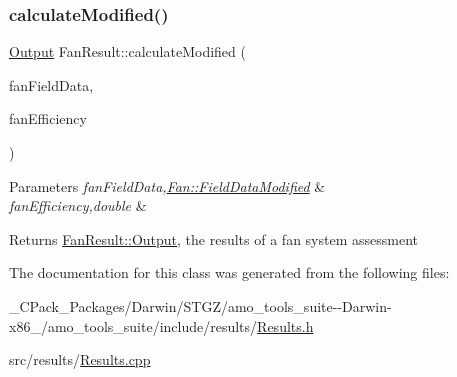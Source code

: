 \subsubsection{\texorpdfstring{calculate\+Modified()}{calculateModified()}\hspace{0.1cm}{\footnotesize\ttfamily [3/3]}}
{\footnotesize\ttfamily \hyperlink{struct_fan_result_1_1_output}{Output} Fan\+Result\+::calculate\+Modified (\begin{DoxyParamCaption}\item[{\hyperlink{struct_fan_1_1_field_data_modified}{Fan\+::\+Field\+Data\+Modified} const \&}]{fan\+Field\+Data,  }\item[{double}]{fan\+Efficiency }\end{DoxyParamCaption})}


\begin{DoxyParams}{Parameters}
{\em fan\+Field\+Data,\hyperlink{struct_fan_1_1_field_data_modified}{Fan\+::\+Field\+Data\+Modified}} & \\
\hline
{\em fan\+Efficiency,double} & \\
\hline
\end{DoxyParams}
\begin{DoxyReturn}{Returns}
\hyperlink{struct_fan_result_1_1_output}{Fan\+Result\+::\+Output}, the results of a fan system assessment 
\end{DoxyReturn}


The documentation for this class was generated from the following files\+:\begin{DoxyCompactItemize}
\item 
\+\_\+\+C\+Pack\+\_\+\+Packages/\+Darwin/\+S\+T\+G\+Z/amo\+\_\+tools\+\_\+suite-\/-\/\+Darwin-\/x86\+\_/amo\+\_\+tools\+\_\+suite/include/results/\hyperlink{___c_pack___packages_2_darwin_2_s_t_g_z_2amo__tools__suite--_darwin-x86__64_2amo__tools__suite_2include_2results_2_results_8h}{Results.\+h}\item 
src/results/\hyperlink{_results_8cpp}{Results.\+cpp}\end{DoxyCompactItemize}
